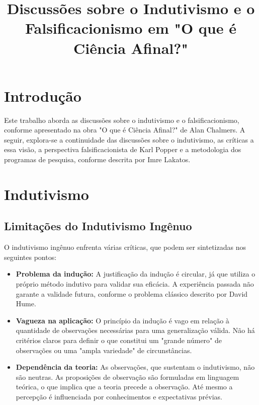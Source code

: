 \documentclass{article} %
\title{Discussões sobre o Indutivismo e o Falsificacionismo em "O que é Ciência Afinal?"}
\author{}
\date{}
\begin{document}
\maketitle
\tableofcontents

\newpage

\section{Introdução}

Este trabalho aborda as discussões sobre o indutivismo e o falsificacionismo, conforme apresentado na obra "O que é Ciência Afinal?" de Alan Chalmers. A seguir, explora-se a continuidade das discussões sobre o indutivismo, as críticas a essa visão, a perspectiva falsificacionista de Karl Popper e a metodologia dos programas de pesquisa, conforme descrita por Imre Lakatos.

\section{Indutivismo}

\subsection{Limitações do Indutivismo Ingênuo}

O indutivismo ingênuo enfrenta várias críticas, que podem ser sintetizadas nos seguintes pontos:

\begin{itemize}
    \item \textbf{Problema da indução:} A justificação da indução é circular, já que utiliza o próprio método indutivo para validar sua eficácia. A experiência passada não garante a validade futura, conforme o problema clássico descrito por David Hume.
    
    \item \textbf{Vagueza na aplicação:} O princípio da indução é vago em relação à quantidade de observações necessárias para uma generalização válida. Não há critérios claros para definir o que constitui um "grande número" de observações ou uma "ampla variedade" de circunstâncias.
    
    \item \textbf{Dependência da teoria:} As observações, que sustentam o indutivismo, não são neutras. As proposições de observação são formuladas em linguagem teórica, o que implica que a teoria precede a observação. Até mesmo a percepção é influenciada por conhecimentos e expectativas prévias.
\end{itemize}
\end{document}
